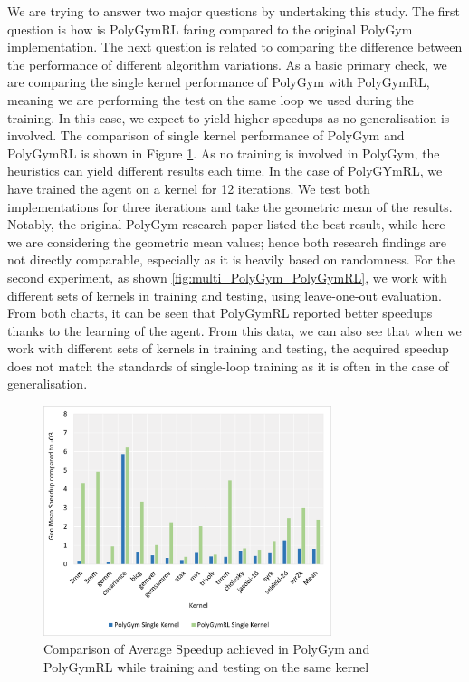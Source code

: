 \documentclass[logo,msc]{infthesis}           %
\begin{document}
 We are trying to answer two major questions by undertaking this study. The first question is how is PolyGymRL faring compared to the original PolyGym implementation. The next question is related to comparing the difference between the performance of different algorithm variations. As a basic primary check, we are comparing the single kernel performance of PolyGym with PolyGymRL, meaning we are performing the test on the same loop we used during the training. In this case, we expect to yield higher speedups as no generalisation is involved. The comparison of single kernel performance of PolyGym and PolyGymRL is shown in Figure \ref{fig:single_PolyGym_PolyGymRL}. As no training is involved in PolyGym, the heuristics can yield different results each time.  In the case of PolyGYmRL, we have trained the agent on a kernel for 12 iterations. We test both implementations for three iterations and take the geometric mean of the results. Notably, the original PolyGym research paper listed the best result, while here we are considering the geometric mean values; hence both research findings are not directly comparable, especially as it is heavily based on randomness. For the second experiment, as shown \ref{fig:multi_PolyGym_PolyGymRL}, we work with different sets of kernels in training and testing, using leave-one-out evaluation. From both charts, it can be seen that PolyGymRL reported better speedups thanks to the learning of the agent. From this data, we can also see that when we work with different sets of kernels in training and testing, the acquired speedup does not match the standards of single-loop training as it is often in the case of generalisation.

\begin{figure}[htbp]
  \centering
  \includegraphics[width=0.75\textwidth]{Images/Chart_Single_PolyGym_PolyGymRL.png}    
  \caption{Comparison of Average Speedup achieved in PolyGym and PolyGymRL while training and testing on the same kernel}
  \label{fig:single_PolyGym_PolyGymRL}
\end{figure}
\end{document}
